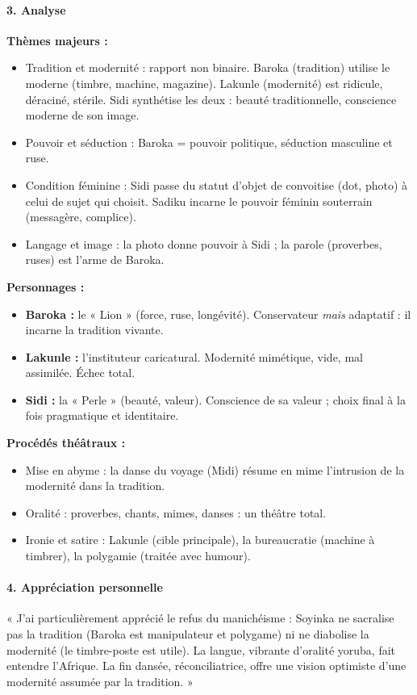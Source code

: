 \documentclass[11pt]{article}
\newcommand{\cle}[1]{{\popxbold\color{popdark}#1}}
\begin{document}
\begin{exoresolu}
\paragraph{3. Analyse}
\textbf{Thèmes majeurs :}
\begin{itemize}
    \item \cle{Tradition et modernité :} rapport non binaire. Baroka (tradition) utilise le moderne (timbre, machine, magazine). Lakunle (modernité) est ridicule, déraciné, stérile. Sidi synthétise les deux : beauté traditionnelle, conscience moderne de son image.
    \item \cle{Pouvoir et séduction :} Baroka = pouvoir politique, séduction masculine et ruse.
    \item \cle{Condition féminine :} Sidi passe du statut d'objet de convoitise (dot, photo) à celui de sujet qui choisit. Sadiku incarne le pouvoir féminin souterrain (messagère, complice).
    \item \cle{Langage et image :} la photo donne pouvoir à Sidi ; la parole (proverbes, ruses) est l'arme de Baroka.
\end{itemize}
\textbf{Personnages :}
\begin{itemize}
    \item \textbf{Baroka :} le « Lion » (force, ruse, longévité). Conservateur \emph{mais} adaptatif : il incarne la tradition vivante.
    \item \textbf{Lakunle :} l'instituteur caricatural. Modernité mimétique, vide, mal assimilée. Échec total.
    \item \textbf{Sidi :} la « Perle » (beauté, valeur). Conscience de sa valeur ; choix final à la fois pragmatique et identitaire.
\end{itemize}
\textbf{Procédés théâtraux :}
\begin{itemize}
    \item \cle{Mise en abyme :} la danse du voyage (Midi) résume en mime l'intrusion de la modernité dans la tradition.
    \item \cle{Oralité :} proverbes, chants, mimes, danses : un théâtre total.
    \item \cle{Ironie et satire :} Lakunle (cible principale), la bureaucratie (machine à timbrer), la polygamie (traitée avec humour).
\end{itemize}

\paragraph{4. Appréciation personnelle}
« J'ai particulièrement apprécié le refus du manichéisme : Soyinka ne sacralise pas la tradition (Baroka est manipulateur et polygame) ni ne diabolise la modernité (le timbre-poste est utile). La langue, vibrante d'oralité yoruba, fait entendre l'Afrique. La fin dansée, réconciliatrice, offre une vision optimiste d'une modernité assumée par la tradition. »


\end{exoresolu}
\end{document}
